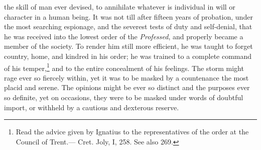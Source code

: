 \documentclass[]{book}
\let\rmarkdownfootnote\footnote%
\def\footnote{\protect\rmarkdownfootnote}
\begin{document}
the skill of man ever devised, to annihilate whatever is individual in will or character in a human being. It was not till after fifteen years of probation, under the most searching espionage, and the severest tests of duty and self-denial, that he was received into the lowest order of the \emph{Professed}, and properly became a member of the society. To render him still more efficient, he was taught to forget country, home, and kindred in his order; he was trained to a complete command of his temper,\footnote{Read the advice given by Ignatius to the representatives of the order at the Council of Trent.--- Cret. Joly, I, 258. See also 269.} and to the entire concealment of his feelings. The storm might rage ever so fiercely within, yet it was to be masked by a countenance the most placid and serene. The opinions might be ever so distinct and the purposes ever so definite, yet on occasions, they were to be masked under words of doubtful import, or withheld by a cautious and dexterous reserve.
\end{document}

